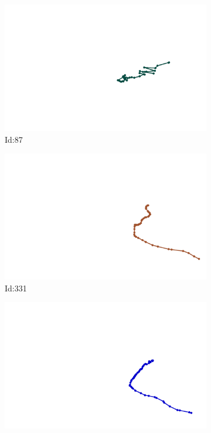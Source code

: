 \documentclass[12pt,twoside]{report}
\begin{document}
\begin{figure}
\centering
\begin{subfigure}[b]{0.20\textwidth}
\centering
\includegraphics[width=\textwidth]{../../trajectories/87.png}
\caption{Id:87}
\end{subfigure}
\begin{subfigure}[b]{0.20\textwidth}
\centering
\includegraphics[width=\textwidth]{../../trajectories/331.png}
\caption{Id:331}
\end{subfigure}
\begin{subfigure}[b]{0.20\textwidth}
\centering
\includegraphics[width=\textwidth]{../../trajectories/466.png}

\end{subfigure}
\end{figure}
\end{document}

